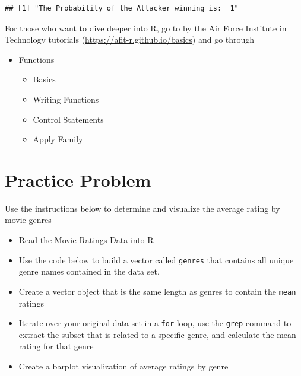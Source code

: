 \documentclass[]{book}
\newenvironment{Shaded}{\begin{snugshade}}{\end{snugshade}}
\newcommand{\KeywordTok}[1]{\textcolor[rgb]{0.13,0.29,0.53}{\textbf{{#1}}}}
\newcommand{\CharTok}[1]{\textcolor[rgb]{0.31,0.60,0.02}{{#1}}}
\newcommand{\StringTok}[1]{\textcolor[rgb]{0.31,0.60,0.02}{{#1}}}
\newcommand{\NormalTok}[1]{{#1}}
\providecommand{\tightlist}{%
  \setlength{\itemsep}{0pt}\setlength{\parskip}{0pt}}
\begin{document}
\begin{verbatim}
## [1] "The Probability of the Attacker winning is:  1"
\end{verbatim}

For those who want to dive deeper into R, go to by the Air Force
Institute in Technology tutorials
(\url{https://afit-r.github.io/basics}) and go through

\begin{itemize}
\tightlist
\item
  Functions

  \begin{itemize}
  \tightlist
  \item
    Basics
  \item
    Writing Functions
  \item
    Control Statements
  \item
    Apply Family
  \end{itemize}
\end{itemize}

\section{Practice Problem}\label{practice-problem-3}

Use the instructions below to determine and visualize the average rating
by movie genres

\begin{itemize}
\tightlist
\item
  Read the Movie Ratings Data into R
\item
  Use the code below to build a vector called \texttt{genres} that
  contains all unique genre names contained in the data set.
\end{itemize}

\begin{Shaded}
\end{Shaded}

\begin{itemize}
\tightlist
\item
  Create a vector object that is the same length as genres to contain
  the \texttt{mean} ratings
\item
  Iterate over your original data set in a \texttt{for} loop, use the
  \texttt{grep} command to extract the subset that is related to a
  specific genre, and calculate the mean rating for that genre
\item
  Create a barplot visualization of average ratings by genre
\end{itemize}
\end{document}
